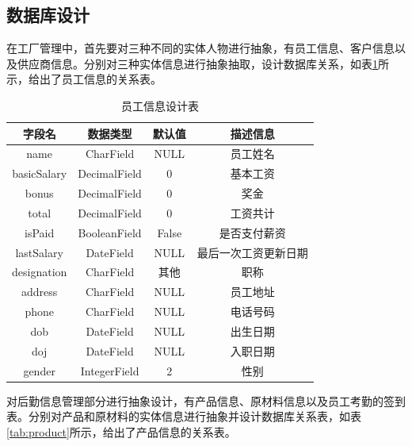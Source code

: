

\subsection{数据库设计}

在工厂管理中，首先要对三种不同的实体人物进行抽象，有员工信息、客户信息以及供应商信息。分别对三种实体信息进行抽象抽取，设计数据库关系，如表\ref{tab:emp}所示，给出了员工信息的关系表。

\begin{table}[H]
    \centering
    \caption{员工信息设计表}
    \label{tab:emp}
    \begin{tabular}{cccc}
        \toprule
        字段名 & 数据类型 & 默认值 & 描述信息 \\
        \midrule
        name & CharField & NULL & 员工姓名 \\
        basicSalary & DecimalField & 0 & 基本工资 \\
        bonus & DecimalField & 0 & 奖金 \\
        total & DecimalField & 0 & 工资共计 \\
        isPaid & BooleanField & False & 是否支付薪资 \\
        lastSalary & DateField & NULL & 最后一次工资更新日期 \\
        designation & CharField & 其他 & 职称 \\
        address & CharField & NULL & 员工地址 \\
        phone & CharField & NULL & 电话号码 \\
        dob & DateField & NULL & 出生日期 \\
        doj & DateField & NULL & 入职日期 \\
        gender & IntegerField & 2 & 性别 \\
        \bottomrule
    \end{tabular}
\end{table}

对后勤信息管理部分进行抽象设计，有产品信息、原材料信息以及员工考勤的签到表。分别对产品和原材料的实体信息进行抽象并设计数据库关系表，如表\ref{tab:product}所示，给出了产品信息的关系表。

